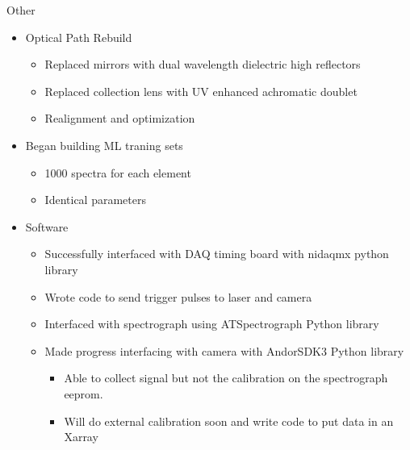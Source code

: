 \documentclass{beamer}
\begin{document}
\begin{frame}{Other}
    \begin{itemize}
        \item Optical Path Rebuild
        \begin{itemize}
            \item Replaced mirrors with dual wavelength dielectric high reflectors
            \item Replaced collection lens with UV enhanced achromatic doublet
            \item Realignment and optimization
        \end{itemize}
        \item Began building ML traning sets
        \begin{itemize}
            \item 1000 spectra for each element
            \item Identical parameters
        \end{itemize}
        \item Software
        \begin{itemize}
            \item Successfully interfaced with DAQ timing board with nidaqmx python library
            \item Wrote code to send trigger pulses to laser and camera
            \item Interfaced with spectrograph using ATSpectrograph Python library
            \item Made progress interfacing with camera with AndorSDK3 Python library
            \begin{itemize}
                \item Able to collect signal but not the calibration on the spectrograph eeprom.
                \item Will do external calibration soon and write code to put data in an Xarray
            \end{itemize}
        \end{itemize}
    \end{itemize}
\end{frame}
\end{document}
